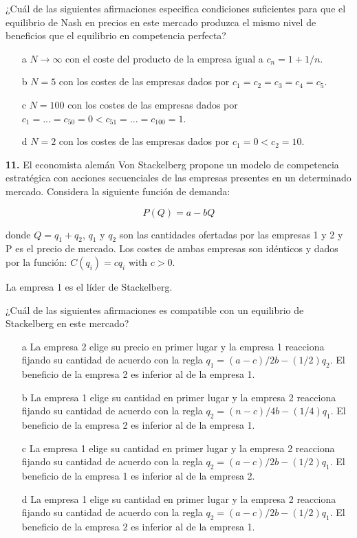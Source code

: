 \documentclass{nuevotema}
\begin{document}
¿Cuál de las siguientes afirmaciones especifica condiciones suficientes para que el equilibrio de Nash en precios en este mercado produzca el mismo nivel de beneficios que el equilibrio en competencia perfecta?

\begin{enumerate}
	\item[a] $N \to \infty$ con el coste del producto de la empresa igual a $c_n = 1 + 1/n$.
	\item[b] $N=5$ con los costes de las empresas dados por $c_1=c_2=c_3=c_4=c_5$.
	\item[c] $N=100$ con los costes de las empresas dados por $c_1=...=c_{50}=0<c_{51}=...=c_{100}=1 $.
	\item[d] $N=2$ con los costes de las empresas dados por $c_1=0< c_2 =10$.
\end{enumerate}

\textbf{11.} El economista alemán Von Stackelberg propone un modelo de competencia estratégica con acciones secuenciales de las empresas presentes en un determinado mercado. Considera la siguiente función de demanda:

\begin{equation}
P(Q) = a - bQ
\end{equation}

donde $Q=q_1 + q_2$, $q_1$ y $q_2$ son las cantidades ofertadas por las empresas 1 y 2 y P es el precio de mercado. Los costes de ambas empresas son idénticos y dados por la función: $C(q_i) = c q_i$ with $c>0$.

La empresa 1 es el líder de Stackelberg.

¿Cuál de las siguientes afirmaciones es compatible con un equilibrio de Stackelberg en este mercado?

\begin{enumerate}
	\item[a] La empresa 2 elige su precio en primer lugar y la empresa 1 reacciona fijando su cantidad de acuerdo con la regla $q_1 = (a-c)/2b -(1/2) q_2$. El beneficio de la empresa 2 es inferior al de la empresa 1.
	\item[b] La empresa 1 elige su cantidad en primer lugar y la empresa 2 reacciona fijando su cantidad de acuerdo con la regla $q_2 = (n -c)/4b - (1/4)q_1$. El beneficio de la empresa 2 es inferior al de la empresa 1.
	\item[c] La empresa 1 elige su cantidad en primer lugar y la empresa 2 reacciona fijando su cantidad de acuerdo con la regla $q_2 = (a-c)/2b - (1/2) q_1$. El beneficio de la empresa 1 es inferior al de la empresa 2.
	\item[d] La empresa 1 elige su cantidad en primer lugar y la empresa 2 reacciona fijando su cantidad de acuerdo con la regla $q_2 = (a-c)/2b - (1/2) q_1$. El beneficio de la empresa 2 es inferior al de la empresa 1.
\end{enumerate}
\end{document}
